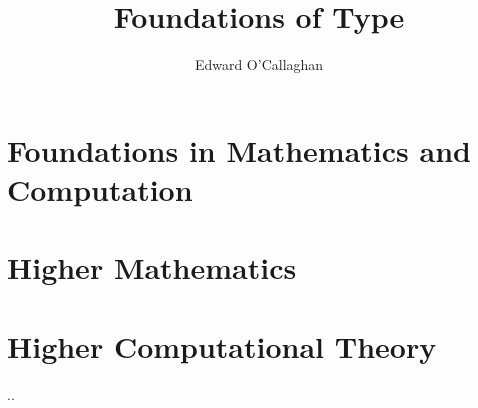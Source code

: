 \documentclass{book}
\begin{document}
\title{Foundations of Type}
\author{Edward O'Callaghan}

\frontmatter

\pagestyle{empty}



\hypertarget{preface}{}

\pagestyle{fancyplain}



\hypertarget{toc}{}

\setcounter{tocdepth}{1} %
\tableofcontents
\setcounter{tocdepth}{2} %

\mainmatter
\pagestyle{fancyplain}





\part{Foundations in Mathematics and Computation}
\label{part:foundationsinmathandcomp}








\part{Higher Mathematics}
\label{part:highermathematics}





\part{Higher Computational Theory}
\label{part:highercomp}

..


\cleartooddpage[\thispagestyle{empty}] %
\end{document}
